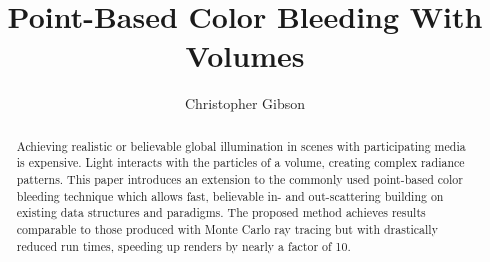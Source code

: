 \documentclass[12pt]{ucthesis}
\begin{document}

\title{Point-Based Color Bleeding With Volumes}
\author{Christopher Gibson}
  
 
     



\maketitle

\begin{frontmatter}

\copyrightpage

\committeemembershippage

\begin{abstract}

Achieving realistic or believable global illumination in scenes with participating media is expensive.  Light interacts with the particles of a volume, creating complex radiance patterns.  This paper introduces an extension to the commonly used point-based color bleeding technique which allows fast, believable in- and out-scattering building on existing data structures and paradigms.  The proposed method achieves results comparable to those produced with Monte Carlo ray tracing but with drastically reduced run times, speeding up renders by nearly a factor of 10. 

\end{abstract}





\tableofcontents


\listoftables

\listoffigures

\end{frontmatter}

\pagestyle{plain}




\renewcommand{\baselinestretch}{1.66}
\end{document}

